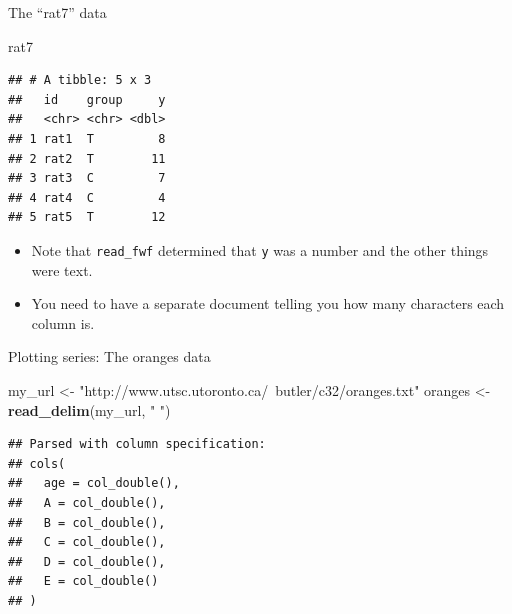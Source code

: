 \documentclass[ignorenonframetext,]{beamer}
\newenvironment{Shaded}{\begin{snugshade}}{\end{snugshade}}
\newcommand{\KeywordTok}[1]{\textcolor[rgb]{0.13,0.29,0.53}{\textbf{#1}}}
\newcommand{\NormalTok}[1]{#1}
\newcommand{\StringTok}[1]{\textcolor[rgb]{0.31,0.60,0.02}{#1}}
\providecommand{\tightlist}{%
  \setlength{\itemsep}{0pt}\setlength{\parskip}{0pt}}
\begin{document}
\begin{frame}[fragile]{The ``rat7'' data}
\protect\hypertarget{the-rat7-data}{}

\begin{Shaded}
\begin{Highlighting}[]
\NormalTok{rat7}
\end{Highlighting}
\end{Shaded}

\begin{verbatim}
## # A tibble: 5 x 3
##   id    group     y
##   <chr> <chr> <dbl>
## 1 rat1  T         8
## 2 rat2  T        11
## 3 rat3  C         7
## 4 rat4  C         4
## 5 rat5  T        12
\end{verbatim}

\begin{itemize}
\tightlist
\item
  Note that \texttt{read\_fwf} determined that \texttt{y} was a number
  and the other things were text.
\item
  You need to have a separate document telling you how many characters
  each column is.
\end{itemize}

\end{frame}

\begin{frame}[fragile]{Plotting series: The oranges data}
\protect\hypertarget{plotting-series-the-oranges-data}{}

\begin{Shaded}
\begin{Highlighting}[]
\NormalTok{my_url <-}\StringTok{ "http://www.utsc.utoronto.ca/~butler/c32/oranges.txt"}
\NormalTok{oranges <-}\StringTok{ }\KeywordTok{read_delim}\NormalTok{(my_url, }\StringTok{" "}\NormalTok{)}
\end{Highlighting}
\end{Shaded}

\begin{verbatim}
## Parsed with column specification:
## cols(
##   age = col_double(),
##   A = col_double(),
##   B = col_double(),
##   C = col_double(),
##   D = col_double(),
##   E = col_double()
## )
\end{verbatim}

\end{frame}
\end{document}
